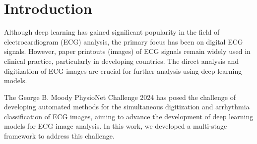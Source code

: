 \section{Introduction}
\label{sec:intro}


Although deep learning has gained significant popularity in the field of electrocardiogram (ECG) analysis, the primary focus has been on digital ECG signals. However, paper printouts (images) of ECG signals remain widely used in clinical practice, particularly in developing countries. The direct analysis and digitization of ECG images are crucial for further analysis using deep learning models.

The George B. Moody PhysioNet Challenge 2024 \cite{goldberger2000physionet, cinc2024} has posed the challenge of developing automated methods for the simultaneous digitization and arrhythmia classification of ECG images, aiming to advance the development of deep learning models for ECG image analysis. In this work, we developed a multi-stage framework to address this challenge.

